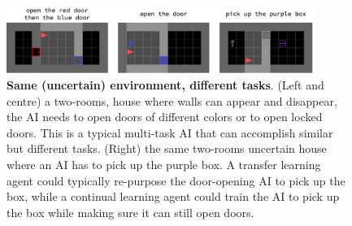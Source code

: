 \documentclass[10pt]{article} %
\begin{document}
  \begin{figure}
    \centering
    \includegraphics[width=0.9\textwidth]{figures/Minigrid_mission.png}
    \caption{\textbf{Same (uncertain) environment, different tasks}. (Left and centre) a two-rooms, house where walls can appear and disappear, the AI needs to open doors of different colors or to open locked doors. 
    This is a typical multi-task AI that can accomplish similar but different tasks. 
    (Right) the same two-rooms uncertain house where an AI has to pick up the purple box.
    A transfer learning agent could typically re-purpose the door-opening AI to pick up the box, while a continual learning agent could train the AI to pick up the box while making sure it can still open doors.}
    \end{figure}
\end{document}
